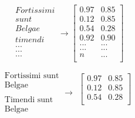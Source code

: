 \begin{figure}[h]
    \centering
    \noindent\begin{minipage}{.32\linewidth}
        \begin{equation*}
            \begin{matrix}
            Fortissimi \\ 
            sunt \\ 
            Belgae \\ 
            timendi \\ 
            ... \\ 
            ... \\ 
            ... \\ 
            \end{matrix}
            \rightarrow 
            \begin{bmatrix}
            0.97 & 0.85 \\ 
            0.12 & 0.85 \\ 
            0.54 & 0.28 \\ 
            0.92 & 0.90 \\ 
            ... & ... \\ 
            ... & ... \\ 
            n & ... \\ 
            \end{bmatrix}
        \end{equation*}
    \end{minipage}%
    \begin{minipage}{.32\linewidth}
        \begin{equation*}
            \begin{matrix}
                \textrm{Fortissimi sunt} \\ 
                \textrm{Belgae} \\ \\
                \textrm{Timendi sunt} \\
                \textrm{Belgae}
            \end{matrix}
            \rightarrow
            \begin{matrix}
            
            \begin{bmatrix}
            0.97 & 0.85 \\ 
            0.12 & 0.85 \\ 
            0.54 & 0.28 \\ 
            \end{bmatrix} \\ \\
            

\end{matrix}
\end{equation*}
\end{minipage}
\end{figure}
